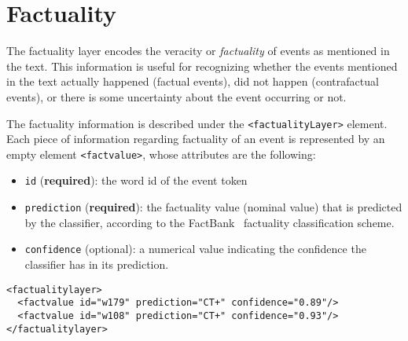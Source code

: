 \section{Factuality}
\label{sec:factuality}

The factuality layer encodes the veracity or \emph{factuality} of events as
mentioned in the text. This information is useful for recognizing whether
the events mentioned in the text actually happened (factual events), did not
happen (contrafactual events), or there is some uncertainty about the event
occurring or not.

The factuality information is described under the \texttt{<factualityLayer>}
element. Each piece of information regarding factuality of an event is
represented by an empty element \texttt{<factvalue>}, whose attributes are
the following:

\begin{itemize}
\item \texttt{id} (\textbf{required}): the word id of the event token
\item \texttt{prediction} (\textbf{required}): the factuality value (nominal
  value) that is predicted by the classifier, according to the
  FactBank~\cite{sauri2009factbank} factuality classification scheme.
\item \texttt{confidence} (optional): a numerical value indicating the
  confidence the classifier has in its prediction.
\end{itemize}

\begin{verbatim}
<factualitylayer>
  <factvalue id="w179" prediction="CT+" confidence="0.89"/>
  <factvalue id="w108" prediction="CT+" confidence="0.93"/>
</factualitylayer>
\end{verbatim}



